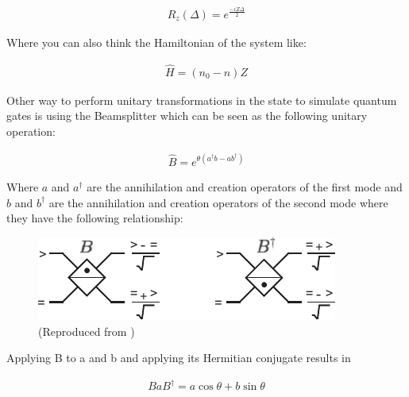 \documentclass[
  journal=largetwo,
  year=2023,
]{cup-journal}
\begin{document}
\begin{equation}
  \begin{aligned}\label{eq:15}
    R_z(\Delta) = e^{\frac{-iZ\Delta}{2}}
  \end{aligned}
\end{equation}


Where you can also think the Hamiltonian of the system like:

\begin{equation}
  \begin{aligned}\label{eq:15}
    \hat{H} = (n_0 - n)Z
  \end{aligned}
\end{equation}


Other way to perform unitary transformations in the state to simulate quantum gates is using the Beamsplitter which can be seen as the following unitary operation:

\begin{equation}
  \begin{aligned}\label{eq:15}
    \hat{B} = e^{\theta(a^{\dag}b - ab^\dag)}
  \end{aligned}
\end{equation}

Where \(a\) and \(a^{\dag}\) are the annihilation and creation operators of the first mode and \(b\) and \(b^{\dag}\) are the annihilation and creation operators of the second mode where they have the following relationship:

\begin{figure}[h]
  \centering
  \includegraphics[width=0.75\linewidth]{figs/beamsplitter.pdf}
  \caption{(Reproduced from \autocite[289]{nielsen_2010_quantum})}
  \label{fig:beamsplitter}
\end{figure}

Applying B to a and b and applying its Hermitian conjugate results in

\begin{equation}
  \begin{aligned}\label{eq:15}
    BaB^{\dag} = a\cos\theta + b\sin\theta
  \end{aligned}
\end{equation}
\end{document}
